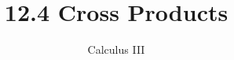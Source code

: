 \documentclass{article}
\begin{document}
\title{12.4 Cross Products}
\author{Calculus III}
\date{}
\maketitle

\end{document}
